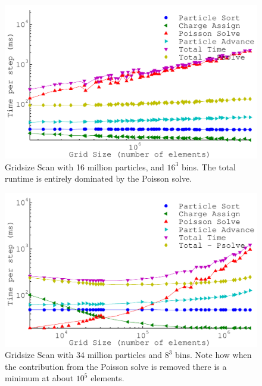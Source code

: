 \begin{figure}
\begin{center}
\includegraphics[width=6in]{performance/gridsize_scan16ptcls16bins.pdf}
\end{center}
\caption[Gridsize Scan with 16 million particles and $16^3$ bins]{Gridsize Scan with 16 million particles, and $16^3$ bins. The total runtime is entirely dominated by the Poisson solve.}
\label{fig:grid_scan16ptcls16bins}
\end{figure}

\begin{figure}
\begin{center}
\includegraphics[width=6in]{performance/gridsize_scan34ptcls8bins.pdf}
\end{center}
\caption[Gridsize Scan with 34 million particles and $8^3$ bins.]{Gridsize Scan with 34 million particles and $8^3$ bins. Note how when the contribution from the Poisson solve is removed there is a minimum at about $10^5$ elements. }
\label{fig:grid_scan34ptcls8bins}
\end{figure}

